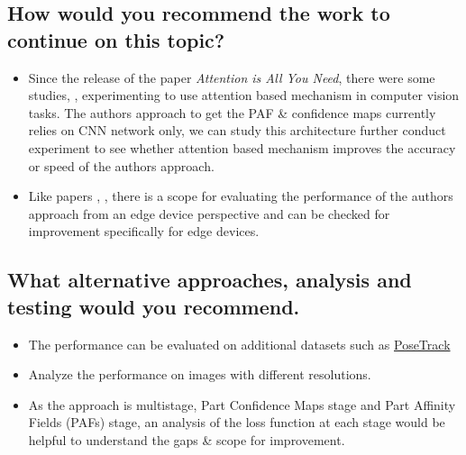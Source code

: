 \documentclass[twocolumn]{article}
\begin{document}
\subsection{How would you recommend the work to continue on this topic?}
\begin{itemize}
	\item Since the release of the paper \emph{Attention is All You Need}\cite{Vaswani2017AttentionIA}, there were some studies, \cite{Dosovitskiy2021AnII}, experimenting to use attention based mechanism in computer vision tasks. The authors approach to get the PAF \& confidence maps currently relies on CNN network only, we can study this architecture further conduct experiment to see whether attention based mechanism improves the accuracy or speed of the authors approach.
	\item Like papers \cite{Howard2017MobileNetsEC}, \cite{Groos2021EfficientPoseSS}, there is a scope for evaluating the performance of the authors approach from an edge device perspective and can be checked for improvement specifically for edge devices.  
\end{itemize}

\subsection{What alternative approaches, analysis and testing would you recommend.}
\begin{itemize}
	\item The performance can be evaluated on additional datasets such as \href{https://posetrack.net/}{PoseTrack}
	\item Analyze the performance on images with different resolutions.
	\item As the approach is multistage, Part Confidence Maps stage and Part Affinity Fields (PAFs) stage, an analysis of the loss function at each stage would be helpful to understand the gaps \& scope for improvement.
\end{itemize}





\end{document}
